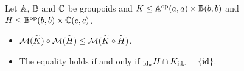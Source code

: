 \begin{lemma}\label{lem:matrix:composition-of-signle-orbit}
    Let \( \mathbb{A} \), \( \mathbb{B} \) and \( \mathbb{C} \) be groupoids and \( K \le \mathbb{A}^{\mathrm{op}}(a,a) \times \mathbb{B}(b,b) \) and \( H \le \mathbb{B}^{\mathrm{op}}(b,b) \times \mathbb{C}(c,c) \).
    \begin{itemize}
        \item \( \mathcal{M}({\widetilde{K}}) \circ \mathcal{M}({\widetilde{H}}) \le \mathcal{M}({\widetilde{K} \circ \widetilde{H}}) \).
        \item
            The equality holds if and only if \( {}_{\mathrm{id}_a}H \cap K_{\mathrm{id}_c} = \{ \mathrm{id} \} \).
    \end{itemize}
\end{lemma}
